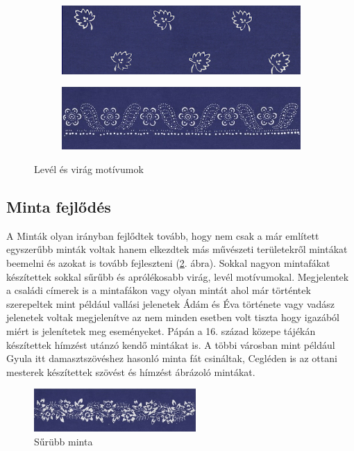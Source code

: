 \begin{figure}[h!]
	\centering
	\begin{subfigure}[b]{0.4\linewidth}
	  \includegraphics[width=\linewidth]{img/levél01.png}
	  \caption{}
	\end{subfigure}
	\begin{subfigure}[b]{0.43\linewidth}
	  \includegraphics[width=\linewidth]{img/virág 01.jpg}
	  \caption{}
	\end{subfigure}
	\caption{Levél és virág motívumok}
	\label{fig:levelvirag}
  \end{figure}

\subsection{Minta fejlődés}
A Minták olyan irányban fejlődtek tovább, hogy nem csak a már említett egyszerűbb minták voltak hanem  elkezdtek más művészeti területekről mintákat beemelni és azokat is tovább fejleszteni (\ref{fig:suruminta}. ábra).
Sokkal nagyon mintafákat készítettek sokkal sűrűbb és aprólékosabb virág, levél motívumokal. Megjelentek a családi címerek is a mintafákon vagy olyan mintát ahol már történtek szerepeltek mint például vallási jelenetek Ádám és Éva története vagy vadász jelenetek voltak megjelenítve az nem minden esetben volt tiszta hogy igazából miért is jelenítetek meg eseményeket. Pápán a 16. század közepe tájékán  készítettek hímzést utánzó kendő mintákat is. A többi városban mint például Gyula itt damasztszövéshez hasonló minta fát csináltak, Cegléden is az ottani mesterek készítettek szövést és hímzést ábrázoló mintákat.

\begin{figure}[h!]
	\centering
	\includegraphics[width=0.55\textwidth]{img/sürübb minta.jpg}
	\caption{Sűrübb minta}
	\label{fig:suruminta}
\end{figure}


